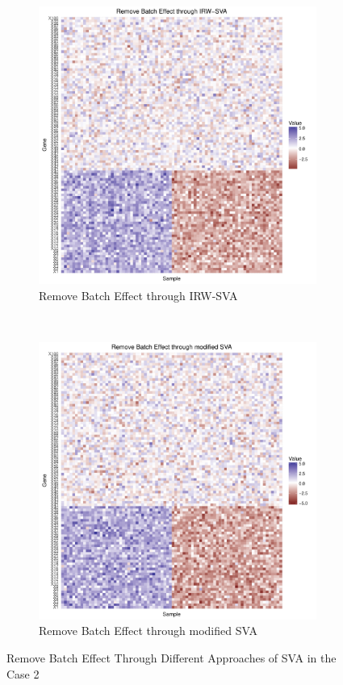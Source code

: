 \documentclass[11pt]{article}
\begin{document}
\begin{figure}[h!]
\begin{subfigure}[b]{0.3\textwidth}
        \includegraphics[width = \textwidth]{figures/sva0.pdf}
        \caption{Remove Batch Effect through IRW-SVA}
    \end{subfigure}  %
~
    \begin{subfigure}[b]{0.3\textwidth}
        \centering
        \includegraphics[width = \textwidth]{figures/new_sva0.pdf}
        \caption{Remove Batch Effect through modified SVA}
    \end{subfigure}    
    \caption{Remove Batch Effect Through Different Approaches of SVA in the Case 2}
\end{figure}
\end{document}
